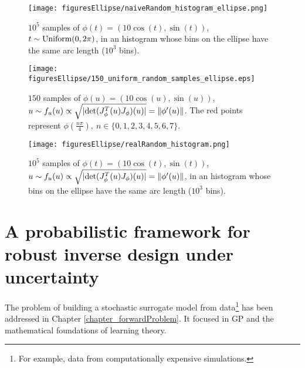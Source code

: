 \begin{figure}[!htbp]
  \centering
    \texttt{[image: figuresEllipse/naiveRandom\_histogram\_ellipse.png]} 
  \caption[Random samples histogram on an ellipse - Naive method]
{
  $10^{5}$ samples of $\phi(t)  = (10\cos(t),\sin(t))$,
  $t \sim \textup{Uniform}(0,2\pi)$,  in an histogram
  whose bins on the ellipse have the same arc length 
  ($10^3$ bins).%
}
\label{fig_ellipseSamplesNaiveHistogram}
\end{figure}

\begin{figure}[!htbp]
  \centering
    \texttt{[image: figuresEllipse/150\_uniform\_random\_samples\_ellipse.eps]} 
  \caption[Uniform random samples on an ellipse]
{
  $150$ samples of $\phi(u) = (10\cos(u),\sin(u))$, 
  $u \sim f_u(u) \propto \sqrt{|\textup{det}(J_{\phi}^T(u)J_{\phi})(u)|} = \|\phi'(u)\|$.
  The red points represent
  $\phi(\frac{n\pi}{4}), \ n \in \{ 0,1,2,3,4,5,6,7 \}$.
}
\label{fig_ellipseTrueSamples}
\end{figure}

\begin{figure}[!htbp]
  \centering
    \texttt{[image: figuresEllipse/realRandom\_histogram.png]} 
  \caption[Uniform random samples histogram on an ellipse]
{
  $10^{5}$ samples of $\phi(t)  = (10\cos(t),\sin(t))$,
  $u \sim f_u(u) \propto \sqrt{|\textup{det}(J_{\phi}^T(u)J_{\phi})(u)|} = \|\phi'(u)\|$,
  in an histogram
  whose bins on the ellipse have the same arc length 
  ($10^3$ bins).%
}
\label{fig_ellipseTrueSampleshistogram}
\end{figure}

\newpage

\section[A probabilistic framework for robust inverse design]{A probabilistic framework for robust inverse design under uncertainty} \label{sec_inverseDesign}

The problem of building a stochastic surrogate model from data\footnote{For example, data from computationally expensive simulations.} has been addressed in Chapter \ref{chapter_forwardProblem}. 
It focused in GP and the mathematical foundations of learning theory.


